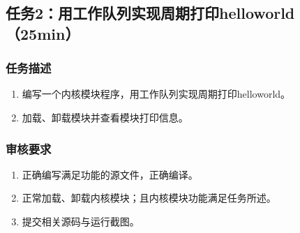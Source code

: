 \documentclass{article}
\begin{document}
\newpage
\subsection{任务2：用工作队列实现周期打印helloworld（25min）}

\subsubsection{任务描述}
\begin{enumerate}
    \item 编写一个内核模块程序，用工作队列实现周期打印helloworld。
    \item 加载、卸载模块并查看模块打印信息。
\end{enumerate}

\subsubsection{审核要求}
\begin{enumerate}
    \item 正确编写满足功能的源文件，正确编译。
    \item 正常加载、卸载内核模块；且内核模块功能满足任务所述。
    \item 提交相关源码与运行截图。
\end{enumerate}
\end{document}
